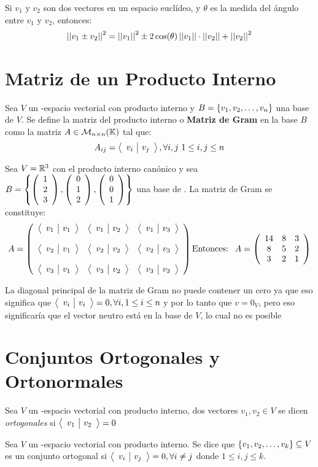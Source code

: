 \begin{theorem}
Si $v_1$ y $v_2$ son dos vectores en un espacio euclídeo, y $\theta$ es la medida del ángulo entre $v_1$ y $v_2$, entonces:
$$\norm{v_1 \pm v_2}^2 = \norm{v_1}^2 \pm 2\cos(\theta)\norm{v_1}\cdot\norm{v_2}+ \norm{v_2}^2$$
\end{theorem}

\section{Matriz de un Producto Interno}
\begin{dfn}
Sea $V$ un \dobleK-espacio vectorial con producto interno \prodInt{\cdot}{\cdot} y $B = \conjvect{v}{n}$ una base de $V$. Se define la matriz del producto interno o \textbf{Matriz de Gram} en la base $B$ como la matriz $A \in \mathcal{M}_{n\times n}(\dobleK)$ tal que:
$$A_{ij} = \prodInt{v_i}{v_j}, \forall i,j \  1 \leq i,j \leq n$$
\end{dfn}

\begin{ejemplo}
    Sea $V = \rtres$ con el producto interno canónico y sea $B = \llav{\vectrtres{1}{2}{3},\vectrtres{0}{1}{2}, \vectrtres{0}{0}{1}}$ una base de \rtres. La matriz de Gram se constituye:
    $$A = \reducir{rrr}{
        \prodInt{v_1}{v_1} & \prodInt{v_1}{v_2} & \prodInt{v_1}{v_3}\\\\
        \prodInt{v_2}{v_1} & \prodInt{v_2}{v_2} & \prodInt{v_2}{v_3}\\\\
        \prodInt{v_3}{v_1} & \prodInt{v_3}{v_2} & \prodInt{v_3}{v_3}
    }
    \text{Entonces: \ }
    A = \reducir{ccc}{
        14 & 8 & 3\\
        8 & 5 & 2\\
        3 & 2 & 1
    }$$
\end{ejemplo}

\begin{obs}
    La diagonal principal de la matriz de Gram no puede contener un cero ya que eso significa que $\prodInt{v_i}{v_i} = 0, \forall i, 1 \leq i \leq n$ y por lo tanto que $v = 0_V$, pero eso significaría que el vector neutro está en la base de $V$, lo cual no es posible
\end{obs}


\section{Conjuntos Ortogonales y Ortonormales}
\begin{dfn}
Sea $V$ un \dobleK-espacio vectorial con producto interno, dos vectores $v_1, v_2 \in V$ se dicen \textit{ortogonales} si $\prodInt{v_1}{v_2} = 0$
\end{dfn}
\begin{dfn}
Sea $V$ un \dobleK-espacio vectorial con producto interno. Se dice que $\conjvect{v}{k} \subseteq V$ es un conjunto ortogonal si $\prodInt{v_i}{v_j} = 0, \forall i \neq j$ donde $1 \leq i,j \leq k$. 
\end{dfn}

